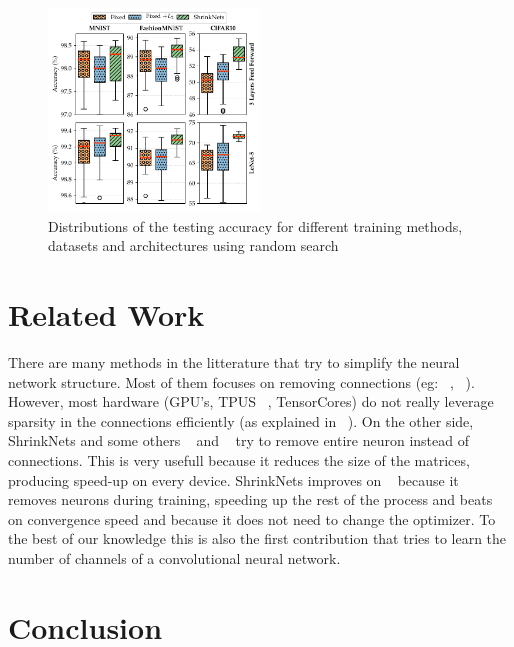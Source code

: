\documentclass[sigconf]{acmart}
\begin{document}
\begin{figure}
\begin{center}
  \includegraphics[width=0.5\textwidth]{hyper_opt}
\caption{Distributions of the testing accuracy for different training methods, datasets and architectures using random search\label{hyper_opt_res}}
\end{center}
\end{figure}

\section{Related Work}

\par There are many methods in the litterature that try to simplify the neural
network structure. Most of them focuses on removing connections (eg: ~\cite{Cun},
~\cite{Han2015}).  However, most hardware (GPU's, TPUS ~\cite{Jouppi2017}, TensorCores) do not really
leverage sparsity in the connections efficiently (as explained in ~\cite{Han2016}). On the other side, ShrinkNets
and some others ~\cite{Scardapane2017} and ~\cite{Philipp} try to remove entire neuron instead of
connections. This is very usefull because it reduces the size of the matrices,
producing speed-up on every device. ShrinkNets improves on
~\cite{Scardapane2017} because it removes neurons during training, speeding up
the rest of the process and beats ~\cite{Philipp} on convergence speed and because it
does not need to change the optimizer. To the best of our knowledge this is
also the first contribution that tries to learn the number of channels of a
convolutional neural network.

\section{Conclusion}
\end{document}
